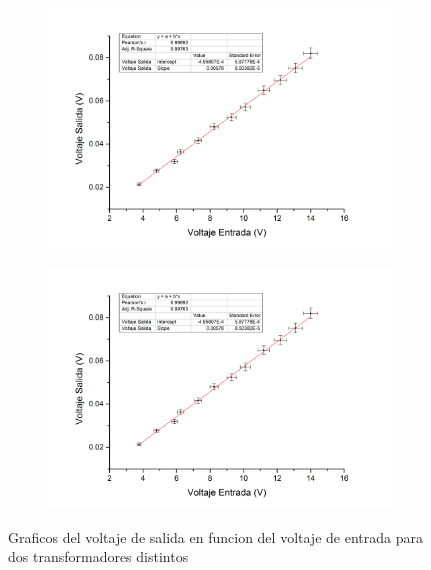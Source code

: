 \documentclass[11pt,a4paper]{article}
\begin{document}
\begin{figure}[H]
	\begin{subfigure}{0.5\textwidth}
		\centering
		\includegraphics[scale=0.4]{Bobina_1600_400}
		\label{subfig:1600_400}
	\end{subfigure}
	\begin{subfigure}{0.5\textwidth}
		\centering
		\includegraphics[scale=0.4]{Bobina_1600_400}
		\label{subfig:800_200}
	\end{subfigure}
	\caption{Graficos del voltaje de salida en funcion del voltaje de entrada para dos transformadores distintos}
\end{figure}
\end{document}
